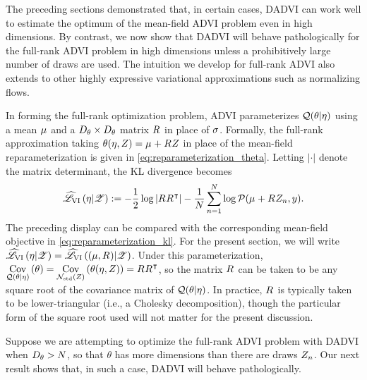 The preceding sections demonstrated that, in certain cases, DADVI can work well
to estimate the optimum of the mean-field ADVI problem even in high dimensions.
By contrast, we now show that DADVI will behave pathologically for the full-rank
ADVI problem in high dimensions unless a prohibitively large number of draws are
used. The intuition we develop for full-rank ADVI also extends to other highly
expressive variational approximations such as normalizing flows.

In forming the full-rank optimization problem, ADVI parameterizes $\mathcal{Q}(\theta |
\eta)$ using a mean $\mu_{}$ and a $D_{\theta} \times D_{\theta}$ matrix ${R_{}}$
in place of $\sigma_{}$.  Formally, the full-rank approximation taking
$\theta(\eta, Z) = \mu_{} + {R_{}} Z$ in place of the mean-field
reparameterization is given in \cref{eq:reparameterization_theta}. Letting
$|\cdot|$ denote the matrix determinant, the KL divergence becomes
%
\begin{align}\label{eq:reparameterization_fr_kl}
    \widehat{\mathscr{L}}_{\mathrm{VI}}\left(\eta | \mathscr{Z}\right) := -\frac{1}{2} \log |{R_{}} {R_{}}^\intercal| -
        \frac{1}{N}\sum_{n=1}^{N} \log \mathcal{P}(\mu_{} + {R_{}} Z_n, y).
\end{align}
%
The preceding display can be compared with the corresponding mean-field
objective in \cref{eq:reparameterization_kl}.
%
For the present section, we will
write $\widehat{\mathscr{L}}_{\mathrm{VI}}\left(\eta | \mathscr{Z}\right) = \widehat{\mathscr{L}}_{\mathrm{VI}}\left((\mu, {R_{}}) | \mathscr{Z}\right)$.  Under this
parameterization, $\underset{\mathcal{Q}(\theta \vert \eta )}{\mathrm{Cov}}\left(\theta\right) =
\underset{\mathcal{N}_{\mathrm{std}}\left(Z\right)}{\mathrm{Cov}}\left(\theta(\eta, Z)\right) = {R_{}} {R_{}}^\intercal$, so the matrix ${R_{}}$ can
be taken to be any square root of the covariance matrix of $\mathcal{Q}(\theta \vert
\eta)$.  In practice, ${R_{}}$ is typically taken to be lower-triangular (i.e., a
Cholesky decomposition), though the particular form of the square root used will
not matter for the present discussion.

Suppose we are attempting to optimize the full-rank ADVI problem with DADVI when
$D_{\theta} > N$, so that $\theta$ has more dimensions than there are draws
$Z_n$.  Our next result shows that, in such a case, DADVI will behave
pathologically.

